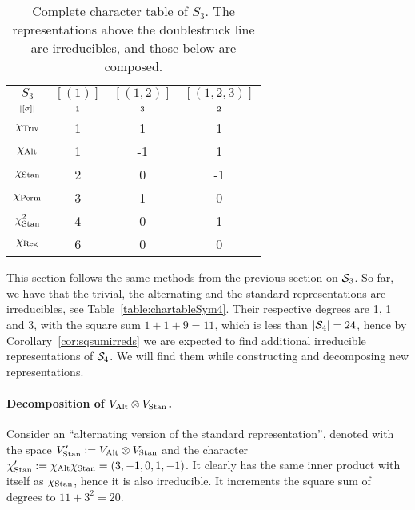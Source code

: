 {\begin{table}[hbt!]
		\begin{tabular}{c | c c c}
			$S_3$         & $[(1)]$   & $[(1,2)]$  & $[(1,2,3)]$ \\
			$\scriptstyle|[\sigma]|$    & $\scriptstyle 1$ & $\scriptstyle 3$ & $\scriptstyle 2$ \\ \hline
			$\chi_{\text{Triv}}$       & 1       & 1       & 1       \\
			$\chi_{\text{Alt}}$       & 1       & -1      & 1       \\
			$\chi_{\text{Stan}}$       & 2       & 0       & -1      \\ \hline\hline
			$\chi_{\text{Perm}}$       & 3       & 1       & 0       \\
			$\chi_{\text{Stan}}^2$ & 4       & 0       & 1       \\
			$\chi_{\text{Reg}}$       & 6       & 0       & 0       		\end{tabular}
			
		\caption{Complete character table of $S_3$. The representations above the doublestruck line are irreducibles, and those below are composed.}
		\label{table:completecharS3}
	\end{table}

\begin{example}
	This section follows the same methods from the previous section on $\mathcal{S}_3$. So far, we have that the trivial, the alternating and the standard representations are irreducibles, see Table~\ref{table:chartableSym4}. Their respective degrees are 1, 1 and 3, with the square sum $1+1+9 = 11$, which is less than $|\mathcal{S}_4|=24$, hence by Corollary~\ref{cor:sqsumirreds} we are expected to find additional irreducible representations of $\mathcal{S}_4$. We will find them while constructing and decomposing new representations.
	
	\paragraph{Decomposition of $V_{\text{Alt}} \otimes V_{\text{Stan}}$.} Consider an ``alternating version of the standard representation'', denoted with the space $V'_{\text{Stan}} := V_{\text{Alt}} \otimes V_{\text{Stan}}$ and the character $\chi'_{\text{Stan}} := \chi_{\text{Alt}}\chi_{\text{Stan}} = (3,-1,0,1,-1)$. It clearly has the same inner product with itself as $\chi_{\text{Stan}}$, hence it is also irreducible. It increments the square sum of degrees to $11 + 3^2 = 20$.
	

\end{example}}
